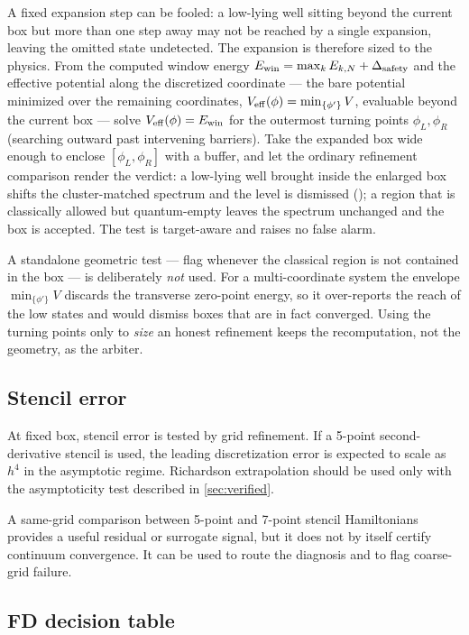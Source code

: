 \documentclass[11pt,a4paper]{article}
\newcommand{\code}[1]{\texttt{\detokenize{#1}}}
\begin{document}
A fixed expansion step can be fooled: a low-lying well sitting beyond the current
box but more than one step away may not be reached by a single expansion, leaving
the omitted state undetected.  The expansion is therefore sized to the physics.
From the computed window energy $E_{\rm win}=\max_k E_{k,N}+\Delta_{\rm safety}$ and
the effective potential along the discretized coordinate --- the bare potential
minimized over the remaining coordinates, $V_{\rm eff}(\phi)=\min_{\{\phi'\}}V$,
evaluable beyond the current box --- solve $V_{\rm eff}(\phi)=E_{\rm win}$ for the
outermost turning points $\phi_L,\phi_R$ (searching outward past intervening
barriers).  Take the expanded box wide enough to enclose $[\phi_L,\phi_R]$ with a
buffer, and let the ordinary refinement comparison render the verdict: a low-lying
well brought inside the enlarged box shifts the cluster-matched spectrum and the
level is dismissed (\code{distrust}); a region that is classically allowed but
quantum-empty leaves the spectrum unchanged and the box is accepted.  The test is
target-aware and raises no false alarm.

A standalone geometric test --- flag whenever the classical region is not
contained in the box --- is deliberately \emph{not} used.  For a multi-coordinate
system the envelope $\min_{\{\phi'\}}V$ discards the transverse zero-point energy,
so it over-reports the reach of the low states and would dismiss boxes that are in
fact converged.  Using the turning points only to \emph{size} an honest refinement
keeps the recomputation, not the geometry, as the arbiter.

\subsection{Stencil error}

At fixed box, stencil error is tested by grid refinement.  If a 5-point second-derivative stencil is used, the leading discretization error is expected to scale as $h^4$ in the asymptotic regime.  Richardson extrapolation should be used only with the asymptoticity test described in \cref{sec:verified}.

A same-grid comparison between 5-point and 7-point stencil Hamiltonians provides a useful residual or surrogate signal, but it does not by itself certify continuum convergence.  It can be used to route the diagnosis and to flag coarse-grid failure.

\subsection{FD decision table}
\end{document}
